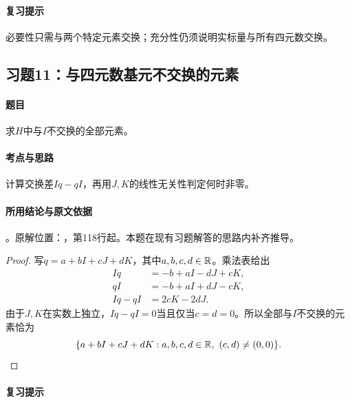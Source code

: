 \paragraph{复习提示}

必要性只需与两个特定元素交换；充分性仍须说明实标量与所有四元数交换。



\subsection{习题11：与四元数基元不交换的元素}

\label{ex:3:11}

\paragraph{题目}

求$H$中与$I$不交换的全部元素。

\paragraph{考点与思路}

计算交换差$I q-q I$，再用$J,K$的线性无关性判定何时非零。

\paragraph{所用结论与原文依据}

。原解位置：，第118行起。本题在现有习题解答的思路内补齐推导。


\begin{proof}

写$q=a+bI+cJ+dK$，其中$a,b,c,d\in\mathbb R$。乘法表给出
\begin{align*}
Iq&=-b+aI-dJ+cK,\\
qI&=-b+aI+dJ-cK,\\
Iq-qI&=2cK-2dJ.
\end{align*}
由于$J,K$在实数上独立，$Iq-qI=0$当且仅当$c=d=0$。所以全部与$I$不交换的元素恰为
\[
\{a+bI+cJ+dK:a,b,c,d\in\R,\ (c,d)\ne(0,0)\}.
\]

\end{proof}

\paragraph{复习提示}

